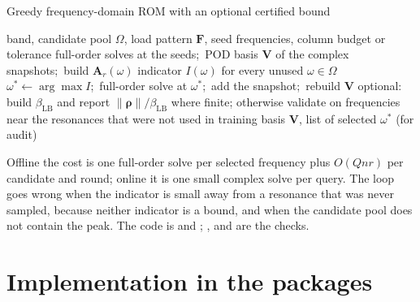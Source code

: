 
\begin{algbox}{Greedy frequency-domain ROM with an optional certified bound}
\begin{pseudo}
\Require band, candidate pool $\Omega$, load pattern $\bm F$, seed frequencies, column budget or tolerance
\State full-order solves at the seeds;\ POD basis $\bm V$ of the complex snapshots;\ build $\bm A_r(\omega)$
\Repeat
  \State indicator $I(\omega)$ for every unused $\omega\in\Omega$ 
  \State $\omega^\ast\gets\arg\max I$;\ full-order solve at $\omega^\ast$;\ add the snapshot;\ rebuild $\bm V$
\State optional: build $\beta_{\mathrm{LB}}$ and report $\|\bm\rho\|/\beta_{\mathrm{LB}}$ where finite; otherwise validate on frequencies near the resonances that were not used in training
\Ensure basis $\bm V$, list of selected $\omega^\ast$ (for audit)
\end{pseudo}
\end{algbox}

Offline the cost is one full-order solve per selected frequency plus $O(Qnr)$ per candidate and round; online it is one small complex solve per query. The loop goes wrong when the indicator is small away from a resonance that was never sampled, because neither indicator is a bound, and when the candidate pool does not contain the peak. The code is  and ; ,  and  are the checks.


\section{Implementation in the packages}\label{sec:fr-impl}

